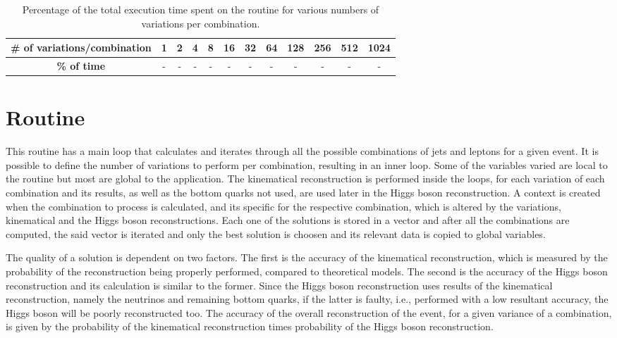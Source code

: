 \begin{table}[!htp]
	\begin{center}
		\begin{tabular}{|c|c|c|c|c|c|c|c|c|c|c|c|}
			\hline
			\textbf{# of variations/combination} & 1 & 2 & 4 & 8 & 16 & 32 & 64 & 128 & 256 & 512 & 1024 \\ \hline
			\textbf{\% of time} & - & - & - & - & - & - & - & - & - & - & - \\ \hline
		\end{tabular}
		\caption{Percentage of the total execution time spent on the \ttDilepKinFit routine for various numbers of variations per combination.}
		\label{tab:TempoKinFit}
	\end{center}
\end{table}


\section{\ttDilepKinFit Routine}
\label{Application:ttDilepKinFit}

This routine has a main loop that calculates and iterates through all the possible combinations of jets and leptons for a given event. It is possible to define the number of variations to perform per combination, resulting in an inner loop. Some of the variables varied are local to the routine but most are global to the application. The kinematical reconstruction is performed inside the loops, for each variation of each combination and its results, as well as the bottom quarks not used, are used later in the Higgs boson reconstruction. A context is created when the combination to process is calculated, and its specific for the respective combination, which is altered by the variations, kinematical and the Higgs boson reconstructions. Each one of the solutions is stored in a vector and after all the combinations are computed, the said vector is iterated and only the best solution is choosen and its relevant data is copied to global variables.

The quality of a solution is dependent on two factors. The first is the accuracy of the kinematical reconstruction, which is measured by the probability of the reconstruction being properly performed, compared to theoretical models. The second is the accuracy of the Higgs boson reconstruction and its calculation is similar to the former. Since the Higgs boson reconstruction uses results of the kinematical reconstruction, namely the neutrinos and remaining bottom quarks, if the latter is faulty, i.e., performed with a low resultant accuracy, the Higgs boson will be poorly reconstructed too. The accuracy of the overall reconstruction of the event, for a given variance of a combination, is given by the probability of the kinematical reconstruction times probability of the Higgs boson reconstruction.

